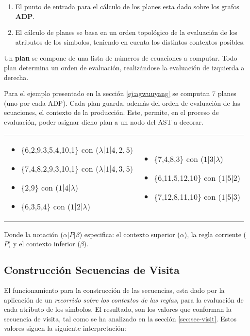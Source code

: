 \documentclass[runningheads,a4paper]{llncs}
\begin{document}
\begin{enumerate}
\item El punto de entrada para el cálculo de los planes esta dado sobre los grafos \textbf{ADP}. 
\item El cálculo de planes se basa en un orden topológico de la evaluación de los atributos de los símbolos, teniendo en cuenta los distintos contextos posibles.
\end{enumerate}

Un \textbf{plan} se compone de una lista de números de ecuaciones a computar. Todo plan determina un orden de evaluación, realizándose la evaluación de izquierda a derecha.


Para el ejemplo presentado en la sección \ref{ej:agwuuyang} se computan 7 planes (uno por cada ADP). Cada plan guarda, además del orden de evaluación de las ecuaciones, el contexto de la producción. Este, permite, en el proceso de evaluación, poder asignar dicho plan a un nodo del AST a decorar.

\begin{tabular}{p{6cm}p{6cm}}
\begin{itemize}
\item \{6,2,9,3,5,4,10,1\} con ($\lambda| 1 | 4,2,5$)
\item \{7,4,8,2,9,3,10,1\} con ($\lambda| 1 | 4,3,5$)
\item \{2,9\} con  ($1 | 4 | \lambda$)
\item \{6,3,5,4\} con  ($ 1 | 2 | \lambda$)
\end{itemize}&
\begin{itemize}
\item \{7,4,8,3\} con  ($ 1 | 3 | \lambda$)
\item \{6,11,5,12,10\} con  ($ 1 | 5 | 2$)
\item \{7,12,8,11,10\} con  ($ 1 | 5 | 3$)
\end{itemize}\\
\end{tabular}

Donde la notación ($\alpha | P | \beta$) especifica: el contexto superior ($\alpha$), la regla corriente ($P$) y el contexto inferior ($\beta$).

\subsection{Construcción Secuencias de Visita}
\label{seubsec:seq-visit}
El funcionamiento para la construcción de las secuencias, esta dado por la aplicación de un \textit{recorrido sobre los contextos de las reglas}, para la evaluación de cada atributo de los símbolos. El resultado, son los valores que conforman la secuencia de visita, tal como se ha analizado en la sección \ref{sec:sec-visit}. Estos valores siguen la siguiente interpretación: 
\end{document}
